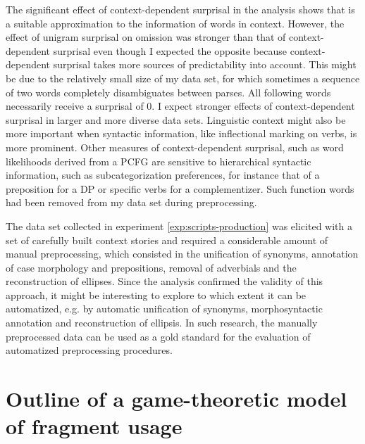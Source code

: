The significant effect of context-dependent surprisal in the analysis shows that is a suitable approximation to the information of words in context. However, the effect of unigram surprisal on omission was stronger than that of context-dependent surprisal even though I expected the opposite because context-depen\-dent surprisal takes more sources of predictability into account. This might be due to the relatively small size of my data set, for which sometimes a sequence of two words completely disambiguates between parses. All following words necessarily receive a surprisal of 0. I expect stronger effects of context-dependent surprisal in larger and more diverse data sets. Linguistic context might also be more important when syntactic information, like inflectional marking on verbs, is more prominent. Other measures of context-dependent surprisal, such as word likelihoods derived from a PCFG \citep{hale2001} are sensitive to hierarchical syntactic information, such as subcategorization preferences, for instance that of a preposition for a DP or specific verbs for a complementizer. Such function words had been removed from my data set during preprocessing.

The data set collected in experiment \ref{exp:scripts-production} was elicited with a set of carefully built context stories and required a considerable amount of manual preprocessing, which consisted in the unification of synonyms, annotation of case morphology and prepositions, removal of adverbials and the reconstruction of ellipses. Since the analysis confirmed the validity of this approach, it might be interesting to explore to which extent it can be automatized, e.g. by automatic unification of synonyms, morphosyntactic annotation and reconstruction of ellipsis. In such research, the manually preprocessed data can be used as a gold standard for the evaluation of automatized preprocessing procedures.

\section[Outline of a game-theoretic model of fragment usage]{Outline of a game-theoretic model of fragment usage}

\label{sec:fragments-game}

